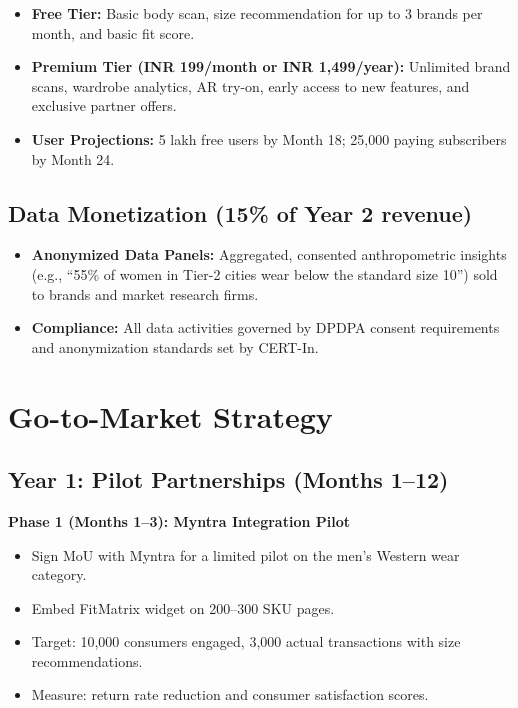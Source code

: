 \documentclass[12pt,a4paper]{article}
\begin{document}
\begin{itemize}
    \item \textbf{Free Tier:} Basic body scan, size recommendation for up to 3 brands per month, and basic fit score.
    \item \textbf{Premium Tier (INR 199/month or INR 1,499/year):} Unlimited brand scans, wardrobe analytics, AR try-on, early access to new features, and exclusive partner offers.
    \item \textbf{User Projections:} 5 lakh free users by Month 18; 25,000 paying subscribers by Month 24.
\end{itemize}

\subsection{Data Monetization (15\% of Year 2 revenue)}

\begin{itemize}
    \item \textbf{Anonymized Data Panels:} Aggregated, consented anthropometric insights (e.g., ``55\% of women in Tier-2 cities wear below the standard size 10'') sold to brands and market research firms.
    \item \textbf{Compliance:} All data activities governed by DPDPA consent requirements and anonymization standards set by CERT-In.
\end{itemize}

\section{Go-to-Market Strategy}

\subsection{Year 1: Pilot Partnerships (Months 1--12)}

\textbf{Phase 1 (Months 1--3): Myntra Integration Pilot}
\begin{itemize}
    \item Sign MoU with Myntra for a limited pilot on the men's Western wear category.
    \item Embed FitMatrix widget on 200--300 SKU pages.
    \item Target: 10,000 consumers engaged, 3,000 actual transactions with size recommendations.
    \item Measure: return rate reduction and consumer satisfaction scores.
\end{itemize}
\end{document}

